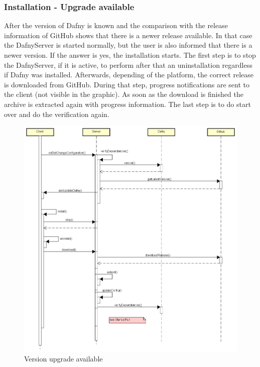 \subsubsection{Installation - Upgrade available}
After the version of Dafny is known and the comparison with the release information of GitHub shows that there is a newer release available. In that case the DafnyServer is started normally, but the user is also informed that there is a newer version. If the answer is yes, the installation starts. The first step is to stop the DafnyServer, if it is active, to perform after that an uninstallation regardless if Dafny was installed. Afterwards, depending of the platform, the correct release is downloaded from GitHub. During that step, progress notifications are sent to the client (not visible in the graphic). As soon as the download is finished the archive is extracted again with progress information. The last step is to do start over and do the verification again. 
\begin{figure}[H]
	\centering
	\includegraphics[width=1\textwidth]{img/DafnyVersionUpgrade}
	\caption{Version upgrade available}
	\label{fig:Version upgrade available}
\end{figure}



